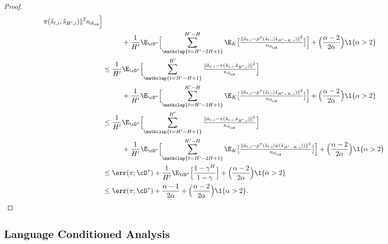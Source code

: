 \begin{proof}
\begin{align}
{        \pi(\tilde{s}_{t,i}, \tilde{s}_{H',i})\|^{2}}{n_{d_\cA}}\Bigr]
        \nonumber                                                                                        \\*
         & \mspace{50mu} + \frac{1}{H'}\E_{\cD^{*}}\Bigl[\sum_{\mathclap{t=H'-2H+1}}^{H'-H}
        \E_{K}\bigl[\tfrac{\|\tilde{a}_{t,i} -
        p^{\pi}(\tilde{s}_{t,i} | \tilde{s}_{H'-K,i})\|^{2}}{n_{d_\cA}}\bigr]\Bigr] +
        \Bigl(\frac{\alpha-2}{2\alpha}\Bigr)\1\{\alpha>2\} \nonumber                                     \\
         & \le \frac{1}{H'} \E_{\cD^{*}}\Bigl[\sum_{\mathclap{t=H'-H+1}}^{H'} \tfrac{\|\tilde{a}_{t,i} -
        \pi(\tilde{s}_{t,i}, \tilde{s}_{H',i})\|^{2}}{n_{d_\cA}}\Bigr]
        \nonumber                                                                                        \\*
         & \mspace{50mu} + \frac{1}{H'}\E_{\cD^{*}}\Bigl[\sum_{\mathclap{t=H'-2H+1}}^{H'-H}
        \E_{K}\bigl[\tfrac{\|\tilde{a}_{t,i} -
        p^{\pi}(\tilde{s}_{t,i} | \tilde{s}_{H'-K,i})\|^{2}}{n_{d_\cA}}\bigr]\Bigr]
        + \Bigl(\frac{\alpha-2}{2\alpha}\Bigr)\1\{\alpha>2\} \nonumber                                   \\
         & \le \frac{1}{H'}\E_{\cD^{*}}\Bigl[\sum_{\mathclap{t=H'-H+1}}^{H'} \tfrac{\|\tilde{a}_{t,i} -
        \pi(\tilde{s}_{t,i}, \tilde{s}_{H',i})\|^{2}}{n_{d_\cA}}\Bigr]
        \nonumber                                                                                        \\*
         & \mspace{50mu} + \frac{1}{H'}\E_{\cD^{*}}\Bigl[\sum_{\mathclap{t=H'-2H+1}}^{H'-H}
        \E_{K}\bigl[\tfrac{\|\tilde{a}_{t,i} -
        p^{\pi}(\tilde{s}_{t,i} | \psi(\tilde{s}_{H'-K,i}))\|^{2}}{n_{d_\cA}}\bigr]\Bigr]
        + \Bigl(\frac{\alpha-2}{2\alpha}\Bigr)\1\{\alpha>2\} \nonumber                                   \\
         & \le \err(\pi; \cD^{*}) + \frac{1}{H'} \E_{\cD^{*}}\Bigl[\frac{1-\gamma^{H}}{1-\gamma}\Bigr]
        + \Bigl(\frac{\alpha-2}{2\alpha}\Bigr)\1\{\alpha>2\} \nonumber                                   \\
         & \le \err(\pi; \cD^{*}) + \frac{\alpha-1}{2\alpha} +
        \Bigl(\frac{\alpha-2}{2\alpha}\Bigr)\1\{\alpha>2\}.
    \end{align}

\end{proof}

\subsection{Language Conditioned Analysis}
\label{app:lang_conditioned}

